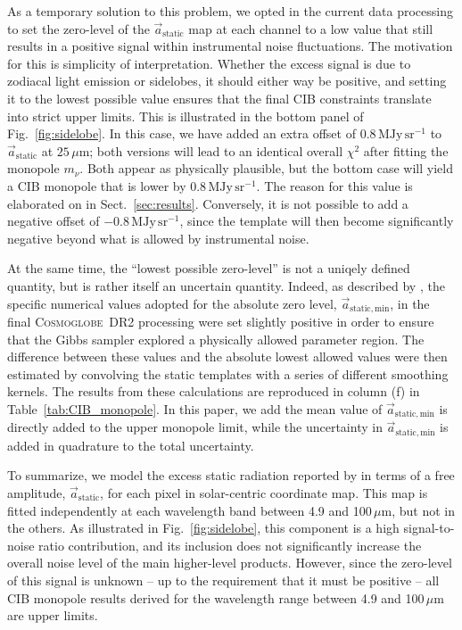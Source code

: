 \documentclass{aa}
\renewcommand{\a}[0]{\vec{a}}
\newcommand{\cosmoglobe}{\textsc{Cosmoglobe}}
\begin{document}
As a temporary solution to this problem, we opted in the
current data processing to set the zero-level of the
$\a_{\mathrm{static}}$ map at each channel to a low value that still
results in a positive signal within instrumental noise
fluctuations. The motivation for this is simplicity of
interpretation. Whether the excess signal is due to zodiacal light
emission or sidelobes, it should either way be positive, and setting
it to the lowest possible value ensures that the final CIB constraints
translate into strict upper limits. This is illustrated in the bottom
panel of Fig.~\ref{fig:sidelobe}. In this case, we have added an extra
offset of 0.8\,$\mathrm{MJy\,sr^{-1}}$ to $\a_{\mathrm{static}}$ at
$25\,\mu\mathrm{m}$; both versions will lead to an identical overall
$\chi^2$ after fitting the monopole $m_{\nu}$.  Both appear as
physically plausible, but the bottom case will yield a CIB monopole
that is lower by 0.8\,$\mathrm{MJy\,sr^{-1}}$. The reason for this
value is elaborated on in Sect.~\ref{sec:results}. Conversely, it
is not possible to add a negative offset of $-0.8$\,$\mathrm{MJy\,sr^{-1}}$, since the
template will then become significantly negative beyond what is
allowed by instrumental noise.

At the same time, the ``lowest possible zero-level'' is not a uniqely
defined quantity, but is rather itself an uncertain quantity. Indeed,
as described by \citet{CG02_01}, the specific numerical values adopted
for the absolute zero level, $\a_{\mathrm{static,min}}$, in the final
\cosmoglobe\ DR2 processing were set slightly positive in order to
ensure that the Gibbs sampler explored a physically allowed parameter
region. The difference between these values and the absolute lowest
allowed values were then estimated by convolving the static templates
with a series of different smoothing kernels. The results from these
calculations are reproduced in column (f) in
Table~\ref{tab:CIB_monopole}. In this paper, we add the mean value of
$\a_{\mathrm{static,min}}$ is directly added to the upper monopole
limit, while the uncertainty in $\a_{\mathrm{static,min}}$ is added in
quadrature to the total uncertainty.

To summarize, we model the excess static radiation reported by in
terms of a free amplitude, $\a_{\mathrm{static}}$, for each pixel in
solar-centric coordinate map. This map is fitted independently at each
wavelength band between 4.9 and 100$\,\mu\mathrm{m}$, but not in the
others. As illustrated in Fig.~\ref{fig:sidelobe}, this component
is a high signal-to-noise ratio contribution, and its
inclusion does not significantly increase the overall noise level of
the main higher-level products. However, since the zero-level of this
signal is unknown -- up to the requirement that it must be positive
-- all CIB monopole results derived for the wavelength range between
4.9 and 100$\,\mu\mathrm{m}$ are upper limits. 
\end{document}
